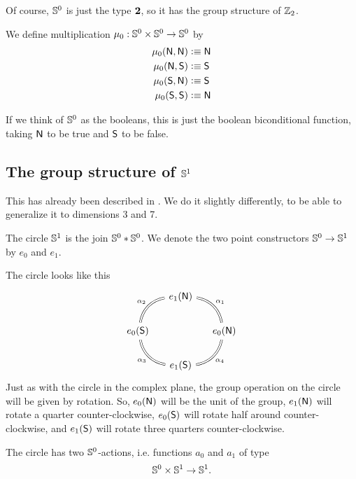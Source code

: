 \documentclass{article}
\newcommand{\join}[2]{{#1}*{#2}}
\begin{document}
Of course, $\mathbb{S}^0$ is just the type $\mathbf{2}$, so it has the group structure of
$\mathbb{Z}_2$.

\begin{defn}
We define multiplication $\mu_0:\mathbb{S}^0\times\mathbb{S}^0\to\mathbb{S}^0$ by
\begin{align*}
\mu_0(\mathsf{N},\mathsf{N}) & \vcentcolon\equiv \mathsf{N} \\
\mu_0(\mathsf{N},\mathsf{S}) & \vcentcolon\equiv \mathsf{S} \\
\mu_0(\mathsf{S},\mathsf{N}) & \vcentcolon\equiv \mathsf{S} \\
\mu_0(\mathsf{S},\mathsf{S}) & \vcentcolon\equiv \mathsf{N}
\end{align*}
\end{defn}
If we think of $\mathbb{S}^0$ as the booleans, this is just the boolean
biconditional function, taking $\mathsf{N}$ to be true and $\mathsf{S}$ to be
false.

\subsection{The group structure of $\mathbb{S}^1$}
This has already been described in \cite{TheBook}. We do it slightly differently,
to be able to generalize it to dimensions 3 and 7.

\begin{defn}
The circle $\mathbb{S}^1$ is the join $\join{\Sn^0}{\Sn^0}$. 
We denote the two point constructors $\mathbb{S}^0\to\mathbb{S}^1$ by $e_0$ and $e_1$. 
\end{defn}

The circle looks like this
\begin{equation*}
\begin{tikzcd}[column sep=small]
& e_1(\north) \arrow[dl,bend right=35,equals,swap,"\alpha_2"] \\
e_0(\south) \arrow[dr,bend right=35,equals,swap,"\alpha_3"] & & e_0(\north) \arrow[ul,bend right=35,equals,swap,"\alpha_1"] \\
& e_1(\south) \arrow[ur,bend right=35,equals,swap,"\alpha_4"] 
\end{tikzcd}
\end{equation*}
Just as with the circle in the complex plane, the group operation on the circle
will be given by rotation. So, $e_0(\mathsf{N})$ will be the unit of the group,
$e_1(\mathsf{N})$ will rotate a quarter counter-clockwise, $e_0(\mathsf{S})$ will rotate
half around counter-clockwise, and $e_1(\mathsf{S})$ will rotate three quarters
counter-clockwise.

\begin{defn}
The circle has two $\mathbb{S}^0$-actions, i.e. functions $a_0$ and $a_1$ of type
\begin{equation*}
\mathbb{S}^0\times\mathbb{S}^1\to\mathbb{S}^1.
\end{equation*}
\end{defn}
\end{document}
